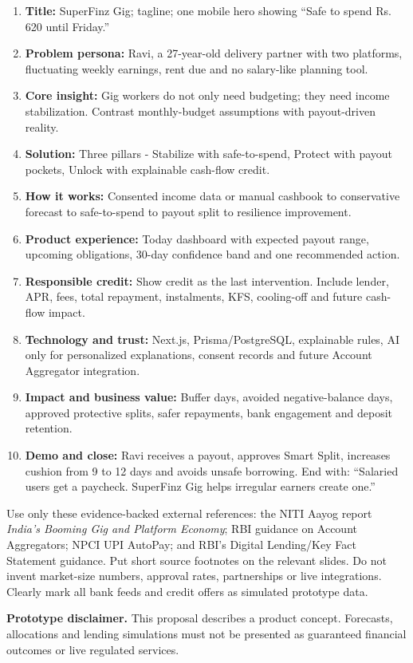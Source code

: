 \documentclass[10pt,a4paper]{article}
\begin{document}
\begin{accentbox}
\begin{enumerate}
  \item \textbf{Title:} SuperFinz Gig; tagline; one mobile hero showing ``Safe to spend Rs. 620 until Friday.''
  \item \textbf{Problem persona:} Ravi, a 27-year-old delivery partner with two platforms, fluctuating weekly earnings, rent due and no salary-like planning tool.
  \item \textbf{Core insight:} Gig workers do not only need budgeting; they need income stabilization. Contrast monthly-budget assumptions with payout-driven reality.
  \item \textbf{Solution:} Three pillars - Stabilize with safe-to-spend, Protect with payout pockets, Unlock with explainable cash-flow credit.
  \item \textbf{How it works:} Consented income data or manual cashbook to conservative forecast to safe-to-spend to payout split to resilience improvement.
  \item \textbf{Product experience:} Today dashboard with expected payout range, upcoming obligations, 30-day confidence band and one recommended action.
  \item \textbf{Responsible credit:} Show credit as the last intervention. Include lender, APR, fees, total repayment, instalments, KFS, cooling-off and future cash-flow impact.
  \item \textbf{Technology and trust:} Next.js, Prisma/PostgreSQL, explainable rules, AI only for personalized explanations, consent records and future Account Aggregator integration.
  \item \textbf{Impact and business value:} Buffer days, avoided negative-balance days, approved protective splits, safer repayments, bank engagement and deposit retention.
  \item \textbf{Demo and close:} Ravi receives a payout, approves Smart Split, increases cushion from 9 to 12 days and avoids unsafe borrowing. End with: ``Salaried users get a paycheck. SuperFinz Gig helps irregular earners create one.''
\end{enumerate}

Use only these evidence-backed external references: the NITI Aayog report \emph{India's Booming Gig and Platform Economy}; RBI guidance on Account Aggregators; NPCI UPI AutoPay; and RBI's Digital Lending/Key Fact Statement guidance. Put short source footnotes on the relevant slides. Do not invent market-size numbers, approval rates, partnerships or live integrations. Clearly mark all bank feeds and credit offers as simulated prototype data.
\end{accentbox}

\vfill
{\small\color{InkSoft}\textbf{Prototype disclaimer.} This proposal describes a product concept. Forecasts, allocations and lending simulations must not be presented as guaranteed financial outcomes or live regulated services.}
\end{document}
